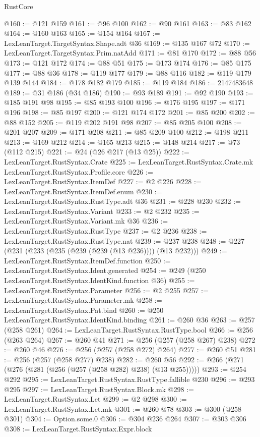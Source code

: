 \begin{lexlean}{RustCore}
\begin{coremodule}
@160 := @121 @159
@161 := @96 @100
@162 := @90 @161
@163 := @83 @162
@164 := @160 @163
@165 := @154 @164
@167 := LexLeanTarget.TargetSyntax.Shape.adt @36
@169 := @135 @167 @72
@170 := LexLeanTarget.TargetSyntax.Prim.natAdd
@171 := @81 @170
@172 := @88 @56
@173 := @121 @172
@174 := @88 @51
@175 := @173 @174
@176 := @85 @175
@177 := @88 @36
@178 := @119 @177
@179 := @88 @116
@182 := @119 @179 @139 @144
@184 := @178 @182 @179
@185 := @119 @184
@186 := 2147483648
@189 := @31 @186 (@34 @186)
@190 := @93 @189
@191 := @92 @190
@193 := @185 @191 @98
@195 := @85 @193 @100
@196 := @176 @195
@197 := @171 @196
@198 := @85 @197
@200 := @121 @174 @172
@201 := @85 @200
@202 := @88 @152
@205 := @119 @202 @191 @98
@207 := @85 @205 @100
@208 := @201 @207
@209 := @171 @208
@211 := @85 @209 @100
@212 := @198 @211
@213 := @169 @212
@214 := @165 @213
@215 := @148 @214
@217 := @73 (@112 @215)
@221 := @24 (@26 @217 (@13 @25))
@222 := LexLeanTarget.RustSyntax.Crate
@225 := LexLeanTarget.RustSyntax.Crate.mk LexLeanTarget.RustSyntax.Profile.core
@226 := LexLeanTarget.RustSyntax.ItemDef
@227 := @2 @226
@228 := LexLeanTarget.RustSyntax.ItemDef.enum
@230 := LexLeanTarget.RustSyntax.RustType.adt @36
@231 := @228 @230
@232 := LexLeanTarget.RustSyntax.Variant
@233 := @2 @232
@235 := LexLeanTarget.RustSyntax.Variant.mk @36
@236 := LexLeanTarget.RustSyntax.RustType
@237 := @2 @236
@238 := LexLeanTarget.RustSyntax.RustType.nat
@239 := @237 @238
@248 := @227 (@231 (@233 (@235 (@239 (@239 (@13 @236)))) (@13 @232)))
@249 := LexLeanTarget.RustSyntax.ItemDef.function
@250 := LexLeanTarget.RustSyntax.Ident.generated
@254 := @249 (@250 LexLeanTarget.RustSyntax.IdentKind.function @36)
@255 := LexLeanTarget.RustSyntax.Parameter
@256 := @2 @255
@257 := LexLeanTarget.RustSyntax.Parameter.mk
@258 := LexLeanTarget.RustSyntax.Pat.bind
@260 := @250 LexLeanTarget.RustSyntax.IdentKind.binding
@261 := @260 @36
@263 := @257 (@258 @261)
@264 := LexLeanTarget.RustSyntax.RustType.bool
@266 := @256 (@263 @264)
@267 := @260 @41
@271 := @256 (@257 (@258 @267) @238)
@272 := @260 @46
@276 := @256 (@257 (@258 @272) @264)
@277 := @260 @51
@281 := @256 (@257 (@258 @277) @238)
@282 := @260 @56
@292 := @266 (@271 (@276 (@281 (@256 (@257 (@258 @282) @238) (@13 @255)))))
@293 := @254 @292
@295 := LexLeanTarget.RustSyntax.RustType.fallible @230
@296 := @293 @295
@297 := LexLeanTarget.RustSyntax.Block.mk
@298 := LexLeanTarget.RustSyntax.Let
@299 := @2 @298
@300 := LexLeanTarget.RustSyntax.Let.mk
@301 := @260 @78
@303 := @300 (@258 @301)
@304 := Option.some.{0}
@306 := @304 @236 @264
@307 := @303 @306
@308 := LexLeanTarget.RustSyntax.Expr.block

\end{coremodule}
\end{lexlean}
